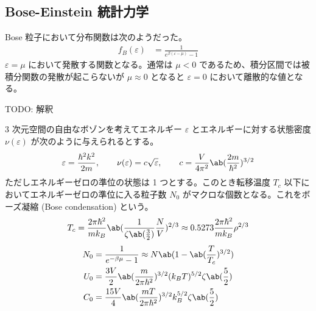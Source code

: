 \documentclass[uplatex,diffipdfmx,a4paper,11pt]{jlreq}
\numberwithin{equation}{section}
\theoremstyle{definition}
\begin{document}
\subsection{Bose-Einstein 統計力学}
Bose 粒子において分布関数は次のようだった。
\begin{align}
  f_B(\varepsilon) & = \frac{1}{e^{\beta(\varepsilon - \mu)} - 1}
\end{align}
$\varepsilon = \mu$ において発散する関数となる。通常は $\mu < 0$ であるため、積分区間では被積分関数の発散が起こらないが $\mu \approx 0$ となると $\varepsilon = 0$ において離散的な値となる。

TODO: 解釈

\begin{theorem}
  3 次元空間の自由なボゾンを考えてエネルギー $\varepsilon$ とエネルギーに対する状態密度 $\nu(\varepsilon)$ が次のように与えられるとする。
  \begin{align}
    \varepsilon = \frac{\hbar^2k^2}{2m}, \qquad \nu(\varepsilon) = c\sqrt{\varepsilon}, \qquad c = \frac{V}{4\pi^2}\ab(\frac{2m}{\hbar^2})^{3/2}
  \end{align}
  ただしエネルギーゼロの準位の状態は 1 つとする。このとき転移温度 $T_c$ 以下においてエネルギーゼロの準位に入る粒子数 $N_0$ がマクロな個数となる。これをボーズ凝縮 (Bose condensation) という。
  \begin{align}
    T_c = \frac{2\pi\hbar^2}{mk_B}\ab(\frac{1}{\zeta\ab(\frac{3}{2})}\frac{N}{V})^{2/3} \approx 0.5273\frac{2\pi\hbar^2}{mk_B}\rho^{2/3}
  \end{align}
  \begin{align}
    N_0 & = \frac{1}{e^{-\beta\mu} - 1} \approx N\ab(1 - \ab(\frac{T}{T_c})^{3/2})        \\
    U_0 & = \frac{3V}{2}\ab(\frac{m}{2\pi\hbar^2})^{3/2}(k_BT)^{5/2}\zeta\ab(\frac{5}{2}) \\
    C_0 & = \frac{15V}{4}\ab(\frac{mT}{2\pi\hbar^2})^{3/2}k_B^{5/2}\zeta\ab(\frac{5}{2})
  \end{align}
\end{theorem}
\end{document}
